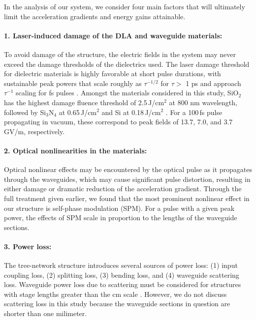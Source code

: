 In the analysis of our system, we consider four main factors that will ultimately limit the acceleration gradients and energy gains attainable.

\paragraph{1. Laser-induced damage of the DLA and waveguide materials:}

To avoid damage of the structure, the electric fields in the system may never exceed the damage thresholds of the dielectrics used.  The laser damage threshold for dielectric materials is highly favorable at short pulse durations, with sustainable peak powers that scale roughly as $\tau^{-1/2}$ for $\tau >$ 1 ps and approach $\tau^{-1}$ scaling for fs pulses \cite{stuart1995laser, stuart1996nanosecond}.  Amongst the materials considered in this study, SiO$_2$ has the highest damage fluence threshold of 2.5\,J/cm$^{2}$ at 800 nm wavelength, followed by Si$_3$N$_4$ at 0.65\,J/cm$^{2}$ and Si at 0.18\,J/cm$^{2}$ \cite{soong2012laser}. For a 100\,fs pulse propagating in vacuum, these correspond to peak fields of 13.7, 7.0, and 3.7\,GV/m, respectively.

\paragraph{2. Optical nonlinearities in the materials:}

Optical nonlinear effects may be encountered by the optical pulse as it propagates through the waveguides, which may cause significant pulse distortion, resulting in either damage or dramatic reduction of the acceleration gradient. Through the full treatment given earlier, we found that the most prominent nonlinear effect in our structure is self-phase modulation (SPM).  For a pulse with a given peak power, the effects of SPM scale in proportion to the lengths of the waveguide sections.
 
\paragraph{3. Power loss:}

The tree-network structure introduces several sources of power loss: (1) input coupling loss, (2) splitting loss, (3) bending loss, and (4) waveguide scattering loss.  Waveguide power loss due to scattering must be considered for structures with stage lengths greater than the cm scale \cite{yamada2011silicon}.  However, we do not discuss scattering loss in this study because the waveguide sections in question are shorter than one milimeter.

